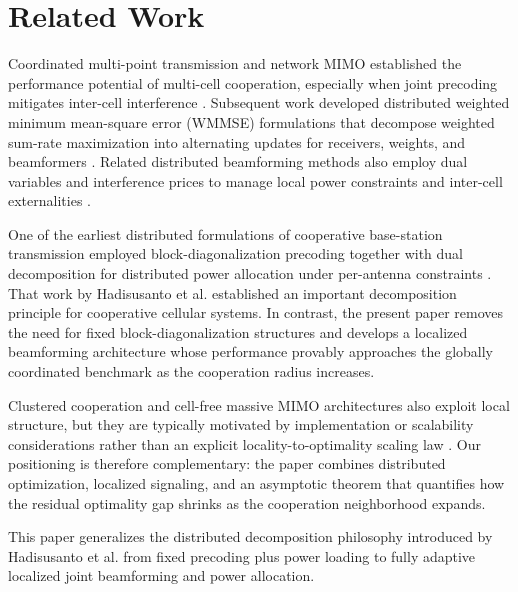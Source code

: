 \section{Related Work}

Coordinated multi-point transmission and network MIMO established the performance potential of multi-cell cooperation, especially when joint precoding mitigates inter-cell interference \cite{Gesbert10}. Subsequent work developed distributed weighted minimum mean-square error (WMMSE) formulations that decompose weighted sum-rate maximization into alternating updates for receivers, weights, and beamformers \cite{Shi11}. Related distributed beamforming methods also employ dual variables and interference prices to manage local power constraints and inter-cell externalities \cite{Dahrouj10}.

One of the earliest distributed formulations of cooperative base-station transmission employed block-diagonalization precoding together with dual decomposition for distributed power allocation under per-antenna constraints \cite{Jungnickel08}. That work by Hadisusanto et al. established an important decomposition principle for cooperative cellular systems. In contrast, the present paper removes the need for fixed block-diagonalization structures and develops a localized beamforming architecture whose performance provably approaches the globally coordinated benchmark as the cooperation radius increases.

Clustered cooperation and cell-free massive MIMO architectures also exploit local structure, but they are typically motivated by implementation or scalability considerations rather than an explicit locality-to-optimality scaling law \cite{Nayebi17}. Our positioning is therefore complementary: the paper combines distributed optimization, localized signaling, and an asymptotic theorem that quantifies how the residual optimality gap shrinks as the cooperation neighborhood expands.

This paper generalizes the distributed decomposition philosophy introduced by Hadisusanto et al. \cite{Jungnickel08} from fixed precoding plus power loading to fully adaptive localized joint beamforming and power allocation.
